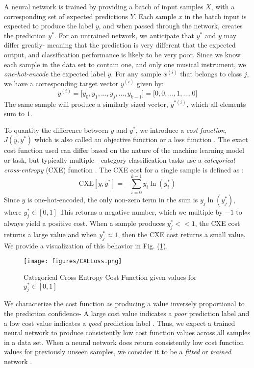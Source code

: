 \documentclass[conference,twocolumn,letterpaper]{IEEEtran}
\begin{document}
A neural network is trained by providing a batch of input samples $X$, with a corresponding set of expected predictions $Y$. Each sample $x$ in the batch input is expected to produce the label $y$, and when passed through the network, creates the prediction $y^*$. For an untrained network, we anticipate that $y^*$ and $y$ may differ greatly- meaning that the prediction is very different that the expected output, and classification performance is likely to be very poor. Since we know each sample in the data set to contain one, and only one musical instrument, we \textit{one-hot-encode} the expected label $y$. For any sample $x^{(i)}$ that belongs to class $j$, we have a corresponding target vector $y^{(i)}$ given by:
\begin{equation}
    \label{eqn:OneHotEnc}
    y^{(i)} = \big[ y_{0} , y_{1}, ... , y_{j}, ... , y_{k-1} \big] = \big[ 0, 0, ... , 1, ... , 0 \big]
\end{equation}
The same sample will produce a similarly sized vector, $y^{*(i)}$, which all elements sum to $1$.

To quantity the difference between $y$ and $y^*$, we introduce a \textit{cost function}, $J(y,y^*)$ which is also called an objective function or a loss function \cite{James}. The exact cost function used can differ based on the nature of the machine learning model or task, but typically multiple - category classification tasks use a \textit{categorical cross-entropy} (CXE) function \cite{Geron,Goodfellow}. The CXE cost for a single sample is defined as \cite{Goodfellow,Virtanen}:
\begin{equation}
    \label{eqn:CXELoss}
    \text{CXE}[y,y^*] = - \sum_{i=0}^{k-1} y_{i} \ln(y^*_{i})
\end{equation}
Since $y$ is one-hot-encoded, the only non-zero term in the sum is $y_{j} \ln(y^*_{j})$, where $y^*_{j} \in [0,1]$ This returns a negative number, which we multiple by $-1$ to always yield a positive cost. When a sample produces $y^*_{j} << 1$, the CXE cost returns a large value and when $y^*_{j} \approx 1$, then the CXE cost returns a small value. We provide a visualization of this behavior in Fig. (\ref{fig:CXELoss}).

\begin{figure}[h]
    \centering
    \texttt{[image: figures/CXELoss.png]}
    \caption{Categorical Cross Entropy Cost Function given values for $y^*_{j} \in [0,1]$}
    \label{fig:CXELoss}
\end{figure}

We characterize the cost function as producing a value inversely proportional to the prediction confidence- A large cost value indicates a \textit{poor} prediction label and a low cost value indicates a \textit{good} prediction label \cite{James,Virtanen}. Thus, we expect a trained neural network to produce consistently low cost function values across all samples in a data set. When a neural network does return consistently low cost function values for previously unseen samples, we consider it to be a \textit{fitted} or \textit{trained} network \cite{Geron,Goodfellow,James}.
\end{document}
